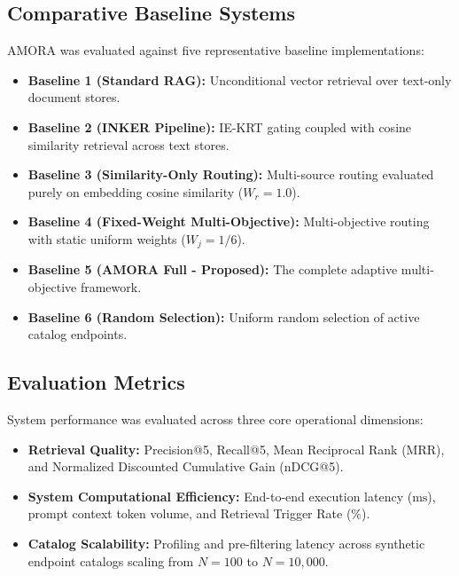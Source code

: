 \documentclass[conference,onecolumn,10pt]{IEEEtran}
\begin{document}
\subsection{Comparative Baseline Systems}
AMORA was evaluated against five representative baseline implementations:
\begin{itemize}
    \item \textbf{Baseline 1 (Standard RAG):} Unconditional vector retrieval over text-only document stores.
    \item \textbf{Baseline 2 (INKER Pipeline):} IE-KRT gating coupled with cosine similarity retrieval across text stores.
    \item \textbf{Baseline 3 (Similarity-Only Routing):} Multi-source routing evaluated purely on embedding cosine similarity ($W_r = 1.0$).
    \item \textbf{Baseline 4 (Fixed-Weight Multi-Objective):} Multi-objective routing with static uniform weights ($W_j = 1/6$).
    \item \textbf{Baseline 5 (AMORA Full - Proposed):} The complete adaptive multi-objective framework.
    \item \textbf{Baseline 6 (Random Selection):} Uniform random selection of active catalog endpoints.
\end{itemize}

\subsection{Evaluation Metrics}
System performance was evaluated across three core operational dimensions:
\begin{itemize}
    \item \textbf{Retrieval Quality:} Precision@5, Recall@5, Mean Reciprocal Rank (MRR), and Normalized Discounted Cumulative Gain (nDCG@5).
    \item \textbf{System Computational Efficiency:} End-to-end execution latency ($\text{ms}$), prompt context token volume, and Retrieval Trigger Rate ($\%$).
    \item \textbf{Catalog Scalability:} Profiling and pre-filtering latency across synthetic endpoint catalogs scaling from $N = 100$ to $N = 10{,}000$.
\end{itemize}

\end{document}
